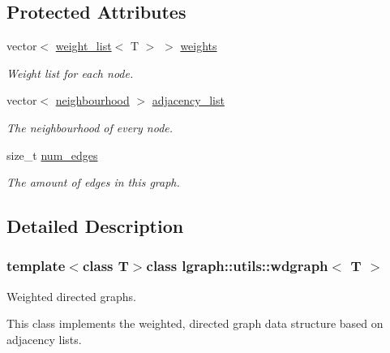 \subsection*{Protected Attributes}
\begin{DoxyCompactItemize}
\item 
vector$<$ \hyperlink{namespacelgraph_1_1utils_a11e7963f3637ea13778b8d3e69d2c17f}{weight\-\_\-list}$<$ T $>$ $>$ \hyperlink{classlgraph_1_1utils_1_1wxgraph_a15569c8c0fccb641709dc81eb0e29c94}{weights}
\begin{DoxyCompactList}\small\item\em Weight list for each node. \end{DoxyCompactList}\item 
\hypertarget{classlgraph_1_1utils_1_1xxgraph_a1d5fda0d5aa89340f997428b982f966f}{vector$<$ \hyperlink{namespacelgraph_1_1utils_a0f2ef47028a466d26841709e705390ac}{neighbourhood} $>$ \hyperlink{classlgraph_1_1utils_1_1xxgraph_a1d5fda0d5aa89340f997428b982f966f}{adjacency\-\_\-list}}\label{classlgraph_1_1utils_1_1xxgraph_a1d5fda0d5aa89340f997428b982f966f}

\begin{DoxyCompactList}\small\item\em The neighbourhood of every node. \end{DoxyCompactList}\item 
\hypertarget{classlgraph_1_1utils_1_1xxgraph_a217ebb1cd8946fedfbf94a9b22f7da48}{size\-\_\-t \hyperlink{classlgraph_1_1utils_1_1xxgraph_a217ebb1cd8946fedfbf94a9b22f7da48}{num\-\_\-edges}}\label{classlgraph_1_1utils_1_1xxgraph_a217ebb1cd8946fedfbf94a9b22f7da48}

\begin{DoxyCompactList}\small\item\em The amount of edges in this graph. \end{DoxyCompactList}\end{DoxyCompactItemize}


\subsection{Detailed Description}
\subsubsection*{template$<$class T$>$class lgraph\-::utils\-::wdgraph$<$ T $>$}

Weighted directed graphs. 

This class implements the weighted, directed graph data structure based on adjacency lists.


